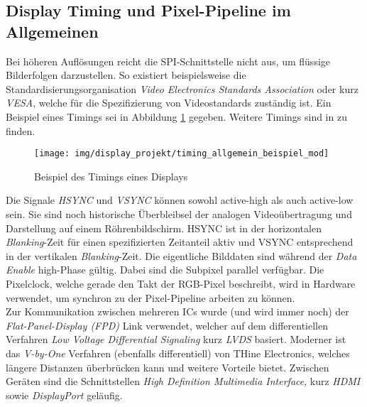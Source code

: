 \subsection{Display Timing und Pixel-Pipeline im Allgemeinen}
\label{subsec:display_timing}
Bei höheren Auflösungen reicht die SPI-Schnittstelle nicht aus, um flüssige Bilderfolgen darzustellen. So existiert beispielsweise die Standardisierungsorganisation \emph{Video Electronics Standards Association} oder kurz \emph{VESA}, welche für die Spezifizierung von Videostandards zuständig ist. Ein Beispiel eines Timings sei in Abbildung \ref{fig:display_timing_bespiel} gegeben. Weitere Timings sind in \cite{vesa_timing} zu finden.
\begin{figure}[H]
\centering
\texttt{[image: img/display\_projekt/timing\_allgemein\_beispiel\_mod]}
\caption{Beispiel des Timings eines Displays}
\label{fig:display_timing_bespiel}
\end{figure}
Die Signale \emph{HSYNC} und \emph{VSYNC} können sowohl active-high als auch active-low sein. Sie sind noch historische Überbleibsel der analogen Videoübertragung und Darstellung auf einem Röhrenbildschirm. HSYNC ist in der horizontalen \emph{Blanking}-Zeit für einen spezifizierten Zeitanteil aktiv und VSYNC entsprechend in der vertikalen \emph{Blanking}-Zeit. Die eigentliche Bilddaten sind während der \emph{Data Enable} high-Phase gültig. Dabei sind die Subpixel parallel verfügbar. Die Pixelclock, welche gerade den Takt der RGB-Pixel beschreibt, wird in Hardware verwendet, um synchron zu der Pixel-Pipeline arbeiten zu können.\\
Zur Kommunikation zwischen mehreren ICs wurde (und wird immer noch) der \emph{ Flat-Panel-Display (FPD)} Link verwendet, welcher auf dem differentiellen Verfahren \emph{Low Voltage Differential Signaling} kurz \emph{LVDS} basiert. Moderner ist das \emph{V-by-One} Verfahren (ebenfalls differentiell) von THine Electronics, welches längere Distanzen überbrücken kann und weitere Vorteile bietet. Zwischen Geräten sind die Schnittstellen \emph{High Definition Multimedia Interface}, kurz \emph{HDMI} sowie \emph{DisplayPort} geläufig.\\


